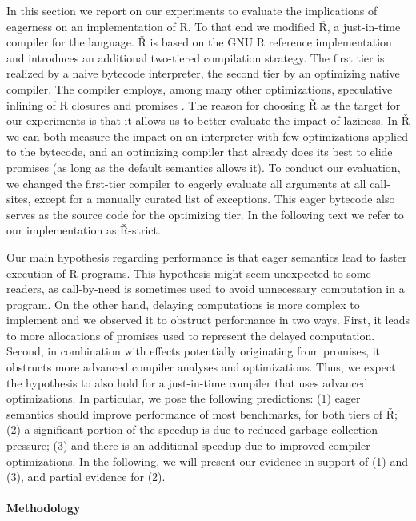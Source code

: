 \documentclass[review,creen,acmsmall]{acmart}
\renewcommand{\Rsh}{{\sf\v R}\xspace}
\newcommand{\Rshstrict}{{\sf\v R-strict}\xspace}
\begin{document}
In this section we report on our experiments to evaluate the implications of
eagerness on an implementation of R. To that end we modified \Rsh, a just-in-time
compiler for the language. \Rsh is based on the GNU R reference implementation
and introduces an additional two-tiered compilation strategy. The
first tier is realized by a naive bytecode interpreter, the second tier
by an optimizing native compiler. The compiler employs, among many other
optimizations, speculative inlining of R closures and promises \citep{dls19,
oopsla20c}.
The reason for choosing \Rsh as the target for our
experiments is that it allows us to better evaluate the impact of laziness. In
\Rsh we can both measure the impact on an interpreter with few optimizations
applied to the bytecode, and an optimizing compiler that already does its best
to elide promises (as long as the default semantics allows it).
To conduct our evaluation, we changed the first-tier
compiler to eagerly evaluate all arguments at all call-sites, except for a
manually curated list of exceptions. This eager bytecode also serves as the source
code for the optimizing tier. In the following text we refer
to our implementation as \Rshstrict.

Our main hypothesis regarding performance is that eager semantics lead to faster
execution of R programs. This hypothesis might seem unexpected to some readers,
as call-by-need is sometimes used to avoid unnecessary computation in a program.
On the other hand, delaying computations is more complex to implement and we
observed it to obstruct performance in two ways. First, it leads to more
allocations of promises used to represent the delayed computation. Second, in
combination with effects potentially originating from promises, it obstructs
more advanced compiler analyses and optimizations. Thus, we expect the hypothesis
to also hold for a just-in-time compiler that uses advanced optimizations.
In particular, we pose the following predictions:
(1) eager semantics should improve performance of most benchmarks, for both tiers
of \Rsh; (2) a significant portion of the speedup is due to reduced garbage
collection pressure; (3) and there is an additional speedup due to improved compiler
optimizations. In the following, we will present our evidence in support of (1)
and (3), and partial evidence for (2).

\paragraph{Methodology}
\end{document}

